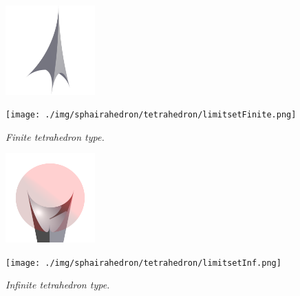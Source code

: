 \documentclass[dvipdfmx]{interact}
\theoremstyle{plain}%
\theoremstyle{definition}
\theoremstyle{remark}
\theoremstyle{problemstyle}
\begin{document}
\begin{figure}[H]
 \begin{minipage}{0.5\textwidth}
  \begin{minipage}[t]{0.24\textwidth}
   \centering
   \includegraphics[width=1.35in, height=1.35in, keepaspectratio]{./img/sphairahedron/tetrahedron/sphairahedronFinite.png}
  \end{minipage}
  \hspace*{\fill}
  \begin{minipage}[t]{0.24\textwidth}
   \centering
   \texttt{[image: ./img/sphairahedron/tetrahedron/limitsetFinite.png]}
  \end{minipage}
  \hspace*{\fill}
  \caption{\textit{Finite tetrahedron type.}}
  \label{fig:tetrahedronFinite}
 \end{minipage}
 \hspace*{\fill}
 \begin{minipage}{0.5\textwidth}
  \begin{minipage}[t]{0.24\textwidth}
   \centering
   \includegraphics[width=1.35in, height=1.35in, keepaspectratio]{./img/sphairahedron/tetrahedron/sphairahedronInf.png}
  \end{minipage}
  \hspace*{\fill}
  \begin{minipage}[t]{0.24\textwidth}
   \centering
   \texttt{[image: ./img/sphairahedron/tetrahedron/limitsetInf.png]}
  \end{minipage}
  \hspace*{\fill}
  \caption{\textit{Infinite tetrahedron type.}}
  \label{fig:tetrahedronInf}
 \end{minipage}
\end{figure}
\end{document}
